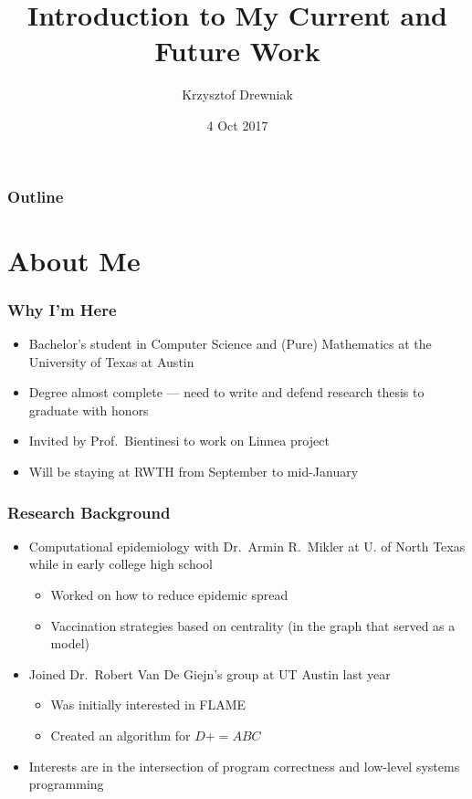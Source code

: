 \documentclass{beamer}
\title[]{Introduction to My Current and Future Work}
\author[]{Krzysztof Drewniak}
\institute[]{Visiting student at HPAC}
\date[]{4 Oct 2017}
\begin{document}
\begin{frame}[plain]
\titlepage{}
\end{frame}

\begin{frame}
  \frametitle{Outline}
  \tableofcontents{}
\end{frame}

\section{About Me}
\begin{frame}
  \frametitle{Why I'm Here}
  \begin{itemize}
  \item Bachelor's student in Computer Science and (Pure) Mathematics at the University of Texas at Austin
  \item Degree almost complete --- need to write and defend research thesis to graduate with honors
  \item Invited by Prof.\ Bientinesi to work on Linnea project
  \item Will be staying at RWTH from September to mid-January
  \end{itemize}
\end{frame}

\begin{frame}
  \frametitle{Research Background}
  \begin{itemize}
  \item Computational epidemiology with Dr.\ Armin R.\ Mikler at U. of North Texas while in early college high school
    \begin{itemize}
    \item Worked on how to reduce epidemic spread
    \item Vaccination strategies based on centrality (in the graph that served as a model)
    \end{itemize}
  \item Joined Dr.\ Robert Van De Giejn's group at UT Austin last year
    \begin{itemize}
    \item Was initially interested in FLAME
    \item Created an algorithm for $D += ABC$
    \end{itemize}
  \item Interests are in the intersection of program correctness and low-level systems programming
  \end{itemize}
\end{frame}
\end{document}
